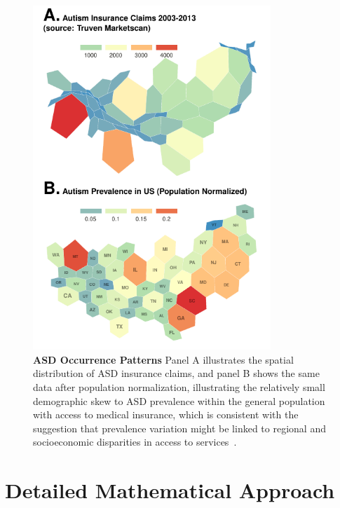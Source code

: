 \documentclass[3p,super,numbers,sort&compress,preprint,10pt]{elsarticle}
\renewcommand{\captionN}[1]{\caption{\color{CadetBlue4!80!black} \sffamily \fontsize{9}{10}\selectfont #1  }}
\newif\ifFIGS
\begin{document}
\ifFIGS
\begin{figure}[!ht]
  \centering
  \includegraphics[width=0.8\textwidth]{Figures/External/occurv}

  \captionN{\textbf{ASD Occurrence Patterns}  Panel A illustrates the spatial distribution of ASD insurance claims, and panel B shows the same data after population normalization, illustrating the relatively small demographic skew to ASD prevalence within the general population with access to medical insurance, which is consistent with the suggestion that prevalence variation might be linked to regional and socioeconomic disparities in access to services~\cite{jarquin2011racial}.}\label{figocc}
    \vspace{-5pt}

\end{figure}

\section{Detailed Mathematical Approach}\label{sec:mathdetails}
 
\end{document}
